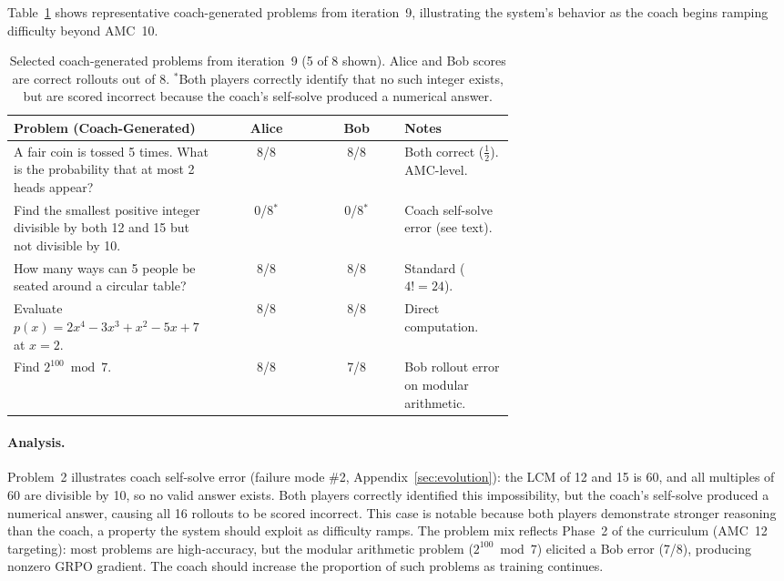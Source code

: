 \documentclass{article}
\begin{document}
Table~\ref{tab:qualitative} shows representative coach-generated problems from iteration~9, illustrating the system's behavior as the coach begins ramping difficulty beyond AMC~10.

\begin{table}[h]
\centering
\small
\begin{tabular}{p{0.42\linewidth}ccp{0.22\linewidth}}
\toprule
\textbf{Problem (Coach-Generated)} & \textbf{Alice} & \textbf{Bob} & \textbf{Notes} \\
\midrule
A fair coin is tossed 5 times. What is the probability that at most 2 heads appear? & 8/8 & 8/8 & Both correct ($\frac{1}{2}$). AMC-level. \\
\addlinespace
Find the smallest positive integer divisible by both 12 and 15 but not divisible by 10. & 0/8$^*$ & 0/8$^*$ & Coach self-solve error (see text). \\
\addlinespace
How many ways can 5 people be seated around a circular table? & 8/8 & 8/8 & Standard ($4! = 24$). \\
\addlinespace
Evaluate $p(x) = 2x^4 - 3x^3 + x^2 - 5x + 7$ at $x = 2$. & 8/8 & 8/8 & Direct computation. \\
\addlinespace
Find $2^{100} \bmod 7$. & 8/8 & 7/8 & Bob rollout error on modular arithmetic. \\
\bottomrule
\end{tabular}
\caption{Selected coach-generated problems from iteration~9 (5 of 8 shown). Alice and Bob scores are correct rollouts out of 8. $^*$Both players correctly identify that no such integer exists, but are scored incorrect because the coach's self-solve produced a numerical answer.}
\label{tab:qualitative}
\end{table}

\paragraph{Analysis.} Problem~2 illustrates coach self-solve error (failure mode \#2, Appendix~\ref{sec:evolution}): the LCM of 12 and 15 is 60, and all multiples of 60 are divisible by 10, so no valid answer exists. Both players correctly identified this impossibility, but the coach's self-solve produced a numerical answer, causing all 16 rollouts to be scored incorrect. This case is notable because both players demonstrate stronger reasoning than the coach, a property the system should exploit as difficulty ramps. The problem mix reflects Phase~2 of the curriculum (AMC~12 targeting): most problems are high-accuracy, but the modular arithmetic problem ($2^{100} \bmod 7$) elicited a Bob error (7/8), producing nonzero GRPO gradient. The coach should increase the proportion of such problems as training continues.
\end{document}
